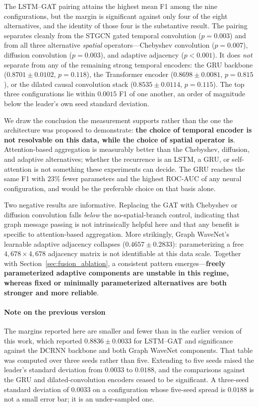 \documentclass[journal]{IEEEtran}
\begin{document}
The LSTM--GAT pairing attains the highest mean F1 among the nine configurations, but the margin is significant against only four of the eight alternatives, and the identity of those four is the substantive result. The pairing separates cleanly from the STGCN gated temporal convolution ($p = 0.003$) and from all three alternative \emph{spatial} operators---Chebyshev convolution ($p = 0.007$), diffusion convolution ($p = 0.003$), and adaptive adjacency ($p < 0.001$). It does \emph{not} separate from any of the remaining strong temporal encoders: the GRU backbone ($0.8701 \pm 0.0102$, $p = 0.118$), the Transformer encoder ($0.8698 \pm 0.0081$, $p = 0.815$), or the dilated causal convolution stack ($0.8535 \pm 0.0114$, $p = 0.115$). The top three configurations lie within $0.0015$ F1 of one another, an order of magnitude below the leader's own seed standard deviation.

We draw the conclusion the measurement supports rather than the one the architecture was proposed to demonstrate: \textbf{the choice of temporal encoder is not resolvable on this data, while the choice of spatial operator is}. Attention-based aggregation is measurably better than the Chebyshev, diffusion, and adaptive alternatives; whether the recurrence is an LSTM, a GRU, or self-attention is not something these experiments can decide. The GRU reaches the same F1 with $23\%$ fewer parameters and the highest ROC-AUC of any neural configuration, and would be the preferable choice on that basis alone.

Two negative results are informative. Replacing the GAT with Chebyshev or diffusion convolution falls \emph{below} the no-spatial-branch control, indicating that graph message passing is not intrinsically helpful here and that any benefit is specific to attention-based aggregation. More strikingly, Graph WaveNet's learnable adaptive adjacency collapses ($0.4657 \pm 0.2833$): parameterizing a free $4{,}678 \times 4{,}678$ adjacency matrix is not identifiable at this data scale. Together with Section~\ref{sec:fusion_ablation}, a consistent pattern emerges---\textbf{freely parameterized adaptive components are unstable in this regime, whereas fixed or minimally parameterized alternatives are both stronger and more reliable}.

\paragraph{Note on the previous version} The margins reported here are smaller and fewer than in the earlier version of this work, which reported $0.8836 \pm 0.0033$ for LSTM--GAT and significance against the DCRNN backbone and both Graph WaveNet components. That table was computed over three seeds rather than five. Extending to five seeds raised the leader's standard deviation from $0.0033$ to $0.0188$, and the comparisons against the GRU and dilated-convolution encoders ceased to be significant. A three-seed standard deviation of $0.0033$ on a configuration whose five-seed spread is $0.0188$ is not a small error bar; it is an under-sampled one.
\end{document}
